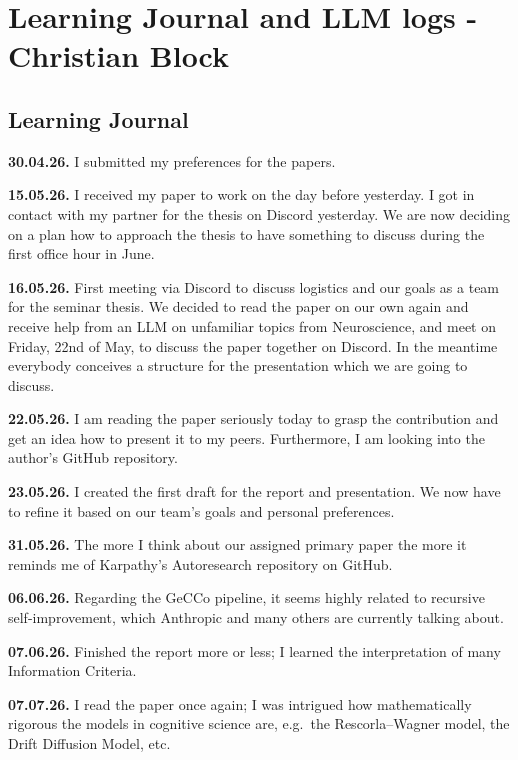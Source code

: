  
\section{Learning Journal and LLM logs - Christian Block}
 
\subsection*{Learning Journal}
 
\textbf{30.04.26.} I submitted my preferences for the papers.
 
\textbf{15.05.26.} I received my paper to work on the day before yesterday. I got in contact with my partner for the thesis on Discord yesterday. We are now deciding on a plan how to approach the thesis to have something to discuss during the first office hour in June.
 
\textbf{16.05.26.} First meeting via Discord to discuss logistics and our goals as a team for the seminar thesis. We decided to read the paper on our own again and receive help from an LLM on unfamiliar topics from Neuroscience, and meet on Friday, 22nd of May, to discuss the paper together on Discord. In the meantime everybody conceives a structure for the presentation which we are going to discuss.
 
\textbf{22.05.26.} I am reading the paper seriously today to grasp the contribution and get an idea how to present it to my peers. Furthermore, I am looking into the author's GitHub repository.
 
\textbf{23.05.26.} I created the first draft for the report and presentation. We now have to refine it based on our team's goals and personal preferences.
 
\textbf{31.05.26.} The more I think about our assigned primary paper the more it reminds me of Karpathy's Autoresearch repository on GitHub.
 
\textbf{06.06.26.} Regarding the GeCCo pipeline, it seems highly related to recursive self-improvement, which Anthropic and many others are currently talking about.
 
\textbf{07.06.26.} Finished the report more or less; I learned the interpretation of many Information Criteria.
 
\textbf{07.07.26.} I read the paper once again; I was intrigued how mathematically rigorous the models in cognitive science are, e.g.\ the Rescorla--Wagner model, the Drift Diffusion Model, etc.
 
